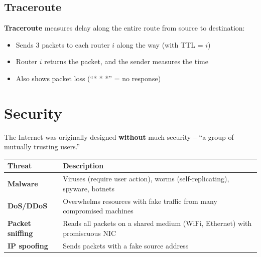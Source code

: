 \begin{center}
\end{center}

\subsection{Traceroute}

\textbf{Traceroute} measures delay along the entire route from source to destination:
\begin{itemize}[noitemsep]
    \item Sends 3 packets to each router $i$ along the way (with TTL = $i$)
    \item Router $i$ returns the packet, and the sender measures the time
    \item Also shows packet loss (``* * *'' = no response)
\end{itemize}

\section{Security}

The Internet was originally designed \textbf{without} much security -- ``a group of mutually trusting users.''

\begin{center}
\begin{tabular}{lp{7cm}}
\toprule
\textbf{Threat} & \textbf{Description} \\
\midrule
\textbf{Malware} & Viruses (require user action), worms (self-replicating), spyware, botnets \\
\textbf{DoS/DDoS} & Overwhelms resources with fake traffic from many compromised machines \\
\textbf{Packet sniffing} & Reads all packets on a shared medium (WiFi, Ethernet) with promiscuous NIC \\
\textbf{IP spoofing} & Sends packets with a fake source address \\
\bottomrule
\end{tabular}
\end{center}

